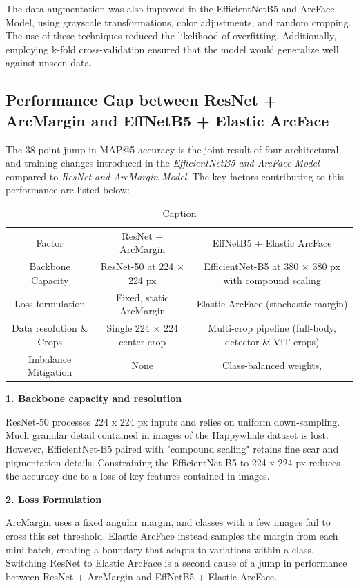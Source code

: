 \documentclass[twocolumn]{article}
\begin{document}
The data augmentation was also improved in the EfficientNetB5 and ArcFace Model, using grayscale transformations, color adjustments, and random cropping. The use of these techniques reduced the likelihood of overfitting. Additionally, employing k-fold cross-validation ensured that the model would generalize well against unseen data. 

\subsection{Performance Gap between ResNet + ArcMargin and EffNetB5 + Elastic ArcFace}

The 38-point jump in MAP@5 accuracy is the joint result of four architectural and training changes introduced in the \textit{EfficientNetB5 and ArcFace Model} compared to \textit{ResNet and ArcMargin Model}. The key factors contributing to this performance are listed below:

\begin{table}
    \centering
    \begin{tabular}{ccc}
         Factor&  ResNet + ArcMargin& EffNetB5 + Elastic ArcFace\\
         Backbone Capacity&  ResNet-50 at 224 × 224 px& EfficientNet-B5 at 380 × 380 px with compound scaling\\
         Loss formulation&  Fixed, static ArcMargin& Elastic ArcFace (stochastic margin)\\
         Data resolution \& Crops&  Single 224 × 224 center crop& Multi-crop pipeline (full-body, detector \& ViT crops)\\
         Imbalance Mitigation&  None& Class-balanced weights,\\
    \end{tabular}
    \caption{Caption}
    \label{tab:my_label}
\end{table}

\textbf{1. Backbone capacity and resolution}

ResNet-50 processes 224 x 224 px inputs and relies on uniform down-sampling. Much granular detail contained in images of the Happywhale dataset is lost. However, EfficientNet-B5 paired with "compound scaling" retains fine scar and pigmentation details. Constraining the EfficientNet-B5 to 224 x 224 px reduces the accuracy due to a loss of key features contained in images. 

\textbf{2. Loss Formulation}

ArcMargin uses a fixed angular margin, and classes with a few images fail to cross this set threshold. Elastic ArcFace instead samples the margin from each mini-batch, creating a boundary that adapts to variations within a class. Switching ResNet to Elastic ArcFace is a second cause of a jump in performance between ResNet + ArcMargin and EffNetB5 + Elastic ArcFace.
\end{document}
